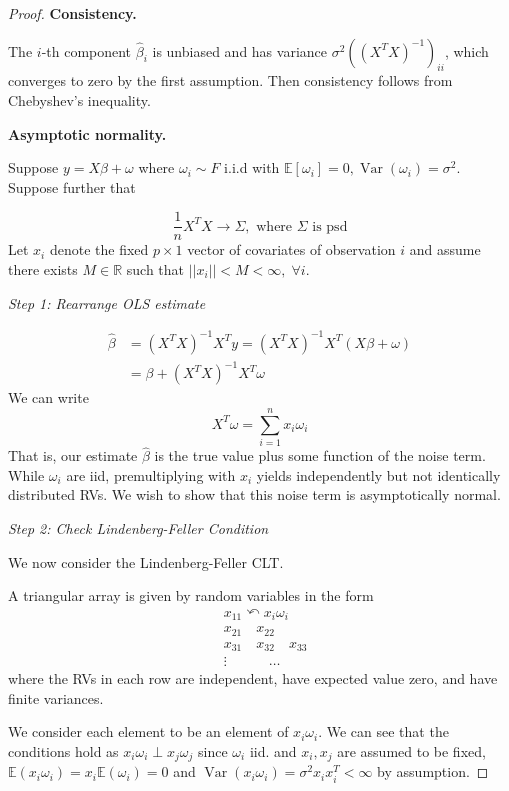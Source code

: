\documentclass[11pt, %
	oneside, %
	english, %
	onehalfspacing, %
	]{article} %
\numberwithin{equation}{section}
\begin{document}
\begin{proof}

    \textbf{Consistency.}

    The $i$-th component $\widehat{\beta}_i$ is unbiased and has variance $\sigma^2\left(\left(X^T X\right)^{-1}\right)_{i i}$, which converges to zero by the first assumption. Then consistency follows from Chebyshev's inequality.

    \textbf{Asymptotic normality.}

    Suppose $y = X \beta + \omega$ where $\omega_i \sim F$ i.i.d with $\mathbb{E} \left[ \omega_i\right] = 0, \operatorname{Var} \left( \omega_i\right) = \sigma^2$. Suppose further that

    $$
    \frac{1}{n} X^T X \to \Sigma, \text{ where } \Sigma \text{ is psd}
    $$
    Let $x_i$ denote the fixed $p \times 1$ vector of covariates of observation $i$ and assume there exists $M \in \mathbb{R}$ such that $||x_i|| < M < \infty, \;\forall i$.

    \emph{Step 1: Rearrange OLS estimate}

    $$
    \begin{aligned}
    \hat{\beta} &= (X^T X)^{-1} X^T y = (X^T X)^{-1} X^T (X \beta + \omega) \\
    &= \beta + (X^T X)^{-1} X^T \omega
    \end{aligned}
    $$
    We can write
    $$
    X^T \omega = \sum_{ i = 1 }^{ n } x_i \omega_i
    $$
    That is, our estimate $\hat{\beta}$ is the true value plus some function of the noise term. While $\omega_i$ are iid, premultiplying with $x_i$ yields independently but not identically distributed RVs. We wish to show that this noise term is asymptotically normal.


    \emph{Step 2: Check Lindenberg-Feller Condition}

    We now consider the Lindenberg-Feller CLT.

    A triangular array is given by random variables in the form
    $$
    \begin{aligned}
    & x_{11} \curvearrowleft x_i \omega_i \\
    & x_{21}  \quad x_{22} \\
    & x_{31} \quad x_{32}  \quad x_{33} \\
    & \vdots \quad \quad \quad \ldots
    \end{aligned}
    $$
    where the RVs in each row are independent, have expected value zero, and have finite variances.

    We consider each element to be an element of $x_i \omega_i$. We can see that the conditions hold as $x_i \omega_i \perp x_j \omega_j$ since $\omega_i$ iid. and $x_i, x_j$ are assumed to be fixed, $\mathbb{E}(x_i \omega_i) = x_i \mathbb{E}(\omega_i) = 0$ and $\operatorname{Var}(x_i \omega_i) = \sigma^2 x_i  x_i^T < \infty$ by assumption.


\end{proof}
\end{document}

